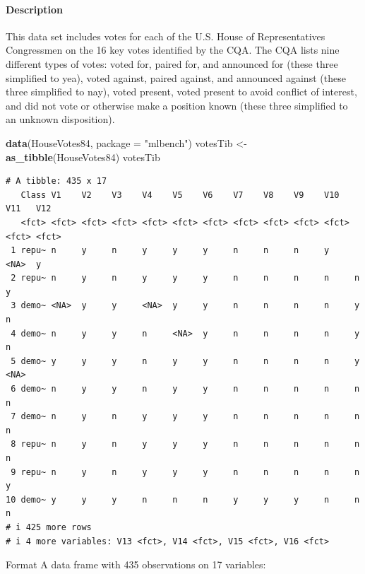 \documentclass[
]{article}
\newenvironment{Shaded}{\begin{snugshade}}{\end{snugshade}}
\newcommand{\AttributeTok}[1]{\textcolor[rgb]{0.13,0.29,0.53}{#1}}
\newcommand{\FunctionTok}[1]{\textcolor[rgb]{0.13,0.29,0.53}{\textbf{#1}}}
\newcommand{\NormalTok}[1]{#1}
\newcommand{\OtherTok}[1]{\textcolor[rgb]{0.56,0.35,0.01}{#1}}
\newcommand{\StringTok}[1]{\textcolor[rgb]{0.31,0.60,0.02}{#1}}
\begin{document}
\paragraph{Description}\label{description}

This data set includes votes for each of the U.S. House of
Representatives Congressmen on the 16 key votes identified by the CQA.
The CQA lists nine different types of votes: voted for, paired for, and
announced for (these three simplified to yea), voted against, paired
against, and announced against (these three simplified to nay), voted
present, voted present to avoid conflict of interest, and did not vote
or otherwise make a position known (these three simplified to an unknown
disposition).

\begin{Shaded}
\begin{Highlighting}[]
\FunctionTok{data}\NormalTok{(HouseVotes84, }\AttributeTok{package =} \StringTok{"mlbench"}\NormalTok{)}
\NormalTok{votesTib }\OtherTok{\textless{}{-}} \FunctionTok{as\_tibble}\NormalTok{(HouseVotes84)}
\NormalTok{votesTib}
\end{Highlighting}
\end{Shaded}

\begin{verbatim}
# A tibble: 435 x 17
   Class V1    V2    V3    V4    V5    V6    V7    V8    V9    V10   V11   V12  
   <fct> <fct> <fct> <fct> <fct> <fct> <fct> <fct> <fct> <fct> <fct> <fct> <fct>
 1 repu~ n     y     n     y     y     y     n     n     n     y     <NA>  y    
 2 repu~ n     y     n     y     y     y     n     n     n     n     n     y    
 3 demo~ <NA>  y     y     <NA>  y     y     n     n     n     n     y     n    
 4 demo~ n     y     y     n     <NA>  y     n     n     n     n     y     n    
 5 demo~ y     y     y     n     y     y     n     n     n     n     y     <NA> 
 6 demo~ n     y     y     n     y     y     n     n     n     n     n     n    
 7 demo~ n     y     n     y     y     y     n     n     n     n     n     n    
 8 repu~ n     y     n     y     y     y     n     n     n     n     n     n    
 9 repu~ n     y     n     y     y     y     n     n     n     n     n     y    
10 demo~ y     y     y     n     n     n     y     y     y     n     n     n    
# i 425 more rows
# i 4 more variables: V13 <fct>, V14 <fct>, V15 <fct>, V16 <fct>
\end{verbatim}

Format A data frame with 435 observations on 17 variables:
\end{document}
